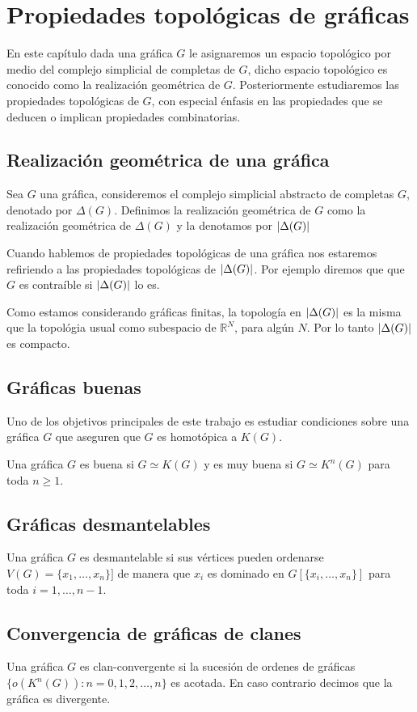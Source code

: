 \chapter{Propiedades topológicas de gráficas}
En este capítulo dada una gráfica $G$ le asignaremos un espacio topológico por medio del complejo simplicial de completas de $G$, dicho espacio topológico es conocido como la realización geométrica de $G$.
Posteriormente estudiaremos las propiedades topológicas de $G$, con especial énfasis en las propiedades que se deducen o implican propiedades combinatorias.

\section{Realización geométrica de una gráfica}
\begin{Defi}
Sea $G$ una gráfica, consideremos el complejo simplicial abstracto de completas $G$, denotado por $\Delta(G)$. Definimos la realización geométrica de $G$ como la realización geométrica de $\Delta(G)$ y la denotamos por $\left| \Delta(G) \right|$
\end{Defi}
Cuando hablemos de propiedades topológicas de una gráfica nos estaremos refiriendo a las propiedades topológicas de $\left| \Delta(G) \right|$. Por ejemplo diremos que que $G$ es contraíble si $\left| \Delta(G) \right|$ lo es.

Como estamos considerando gráficas finitas, la topología en $\left| \Delta(G) \right|$ es la misma que la topológia usual como subespacio de $\mathbb{R}^N$, para algún $N$. Por lo tanto $\left| \Delta(G) \right|$ es compacto.

\section{Gráficas buenas}
Uno de los objetivos principales de este trabajo es estudiar condiciones sobre una gráfica $G$ que aseguren que $G$ es homotópica a $K(G)$.
\begin{Defi}
Una gráfica $G$ es buena si $G\simeq K(G)$ y es muy buena si $G\simeq K^{n}(G)$ para toda $n\geq 1 $.
\end{Defi}

\section{Gráficas desmantelables}
\begin{Defi}
Una gráfica $G$ es desmantelable si sus vértices pueden ordenarse $V(G) = \{x_1,\ldots,x_n\}]$ de manera que $x_i$ es dominado en $G[\{x_i,\ldots,x_n\}]$ para toda $i = 1,\ldots,n-1$.
\end{Defi}

\section{Convergencia de gráficas de clanes}
\begin{Defi}
Una gráfica $G$ es clan-convergente si la sucesión de ordenes de gráficas $\{o(K^{n}(G)): n = 0,1,2,\ldots,n\}$ es acotada. En caso contrario decimos que la gráfica es divergente.
\end{Defi}


